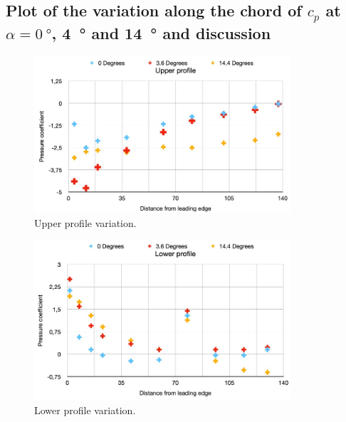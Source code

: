 \documentclass[11pt]{article}
\begin{document}
\subsection*{Plot of the variation along the chord of $c_p$ at $\alpha = \SI{0}{\degree}$, \SI{4}{\degree} and \SI{14}{\degree} and discussion}
\begin{figure}[H]
  \centering
  \includegraphics[width=0.85\textwidth]{./img/diagram10.jpeg}
  \caption{Upper profile variation.}
\end{figure}
\begin{figure}[H]
  \centering
  \includegraphics[width=0.85\textwidth]{./img/diagram11.jpeg}
  \caption{Lower profile variation.}
\end{figure}
\end{document}
